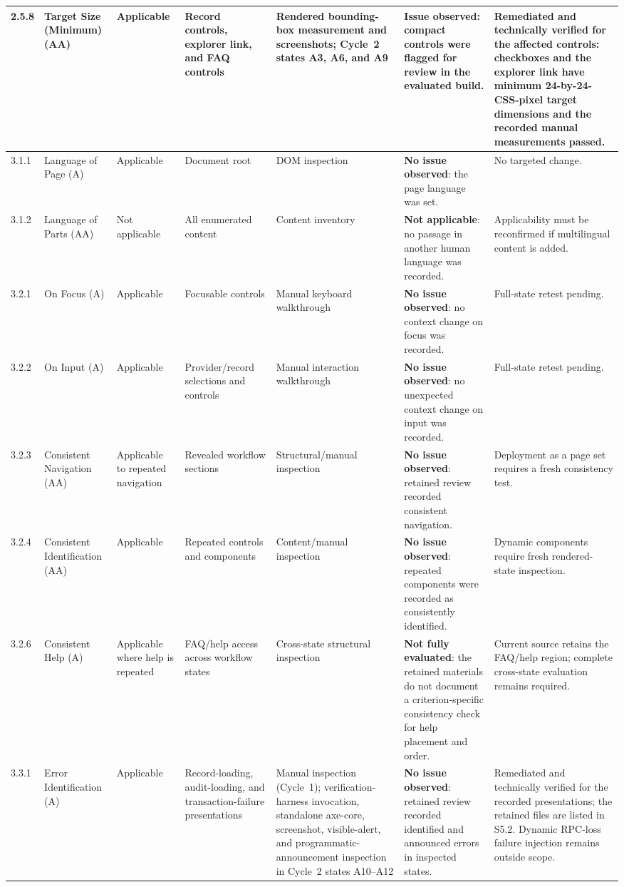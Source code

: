 \documentclass[10pt]{article}
\begin{document}
\begin{landscape}
{\begin{longtable}{|p{1.0cm}|p{3.3cm}|p{1.9cm}|p{2.7cm}|p{2.5cm}|p{4.1cm}|p{4.1cm}|}
2.5.8 & Target Size (Minimum) (AA) & Applicable & Record controls, explorer link, and FAQ controls & Rendered bounding-box measurement and screenshots; Cycle~2 states A3, A6, and A9 & \textbf{Issue observed}: compact controls were flagged for review in the evaluated build. & Remediated and technically verified for the affected controls: checkboxes and the explorer link have minimum 24-by-24-CSS-pixel target dimensions and the recorded manual measurements passed.\\\hline
3.1.1 & Language of Page (A) & Applicable & Document root & DOM inspection & \textbf{No issue observed}: the page language was set. & No targeted change.\\\hline
3.1.2 & Language of Parts (AA) & Not applicable & All enumerated content & Content inventory & \textbf{Not applicable}: no passage in another human language was recorded. & Applicability must be reconfirmed if multilingual content is added.\\\hline
3.2.1 & On Focus (A) & Applicable & Focusable controls & Manual keyboard walkthrough & \textbf{No issue observed}: no context change on focus was recorded. & Full-state retest pending.\\\hline
3.2.2 & On Input (A) & Applicable & Provider/record selections and controls & Manual interaction walkthrough & \textbf{No issue observed}: no unexpected context change on input was recorded. & Full-state retest pending.\\\hline
3.2.3 & Consistent Navigation (AA) & Applicable to repeated navigation & Revealed workflow sections & Structural/manual inspection & \textbf{No issue observed}: retained review recorded consistent navigation. & Deployment as a page set requires a fresh consistency test.\\\hline
3.2.4 & Consistent Identification (AA) & Applicable & Repeated controls and components & Content/manual inspection & \textbf{No issue observed}: repeated components were recorded as consistently identified. & Dynamic components require fresh rendered-state inspection.\\\hline
3.2.6 & Consistent Help (A) & Applicable where help is repeated & FAQ/help access across workflow states & Cross-state structural inspection & \textbf{Not fully evaluated}: the retained materials do not document a criterion-specific consistency check for help placement and order. & Current source retains the FAQ/help region; complete cross-state evaluation remains required.\\\hline
3.3.1 & Error Identification (A) & Applicable & Record-loading, audit-loading, and transaction-failure presentations & Manual inspection (Cycle~1); verification-harness invocation, standalone axe-core, screenshot, visible-alert, and programmatic-announcement inspection in Cycle~2 states A10--A12 & \textbf{No issue observed}: retained review recorded identified and announced errors in inspected states. & Remediated and technically verified for the recorded presentations; the retained files are listed in S5.2. Dynamic RPC-loss failure injection remains outside scope.\\\hline

\end{longtable}}
\end{landscape}
\end{document}
